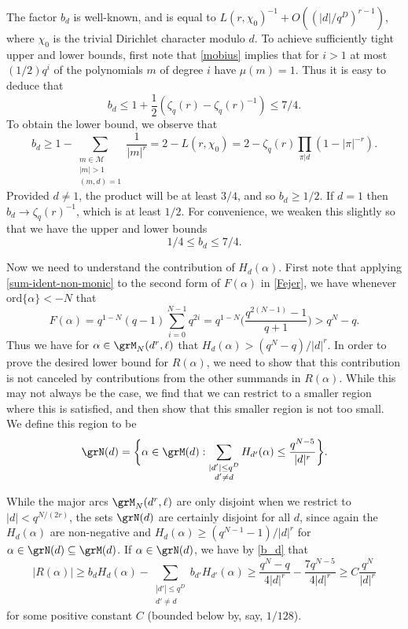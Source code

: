 \documentclass[reqno,11pt]{amsart}
\theoremstyle{definition}
\theoremstyle{remark}
\numberwithin{equation}{section}
\def\calM{{\mathcal M}}
\newcommand{\ord}{\text{ord}}
\newcommand{\<}{\begin{equation}}
\renewcommand{\>}{\end{equation}}
\begin{document}
The factor $b_d$ is well-known, and is equal to $L(r,\chi_0)^{-1} + O((|d|/q^D)^{r-1})$, where $\chi_0$ is the trivial Dirichlet character modulo $d$. To achieve sufficiently tight upper and lower bounds, first note that \eqref{mobius} implies that for $i>1$ at most $(1/2)q^i$ of the polynomials $m$ of degree $i$ have $\mu(m) = 1$. Thus it is easy to deduce that
\<
b_d \leq 1+\dfrac{1}{2}(\zeta_q(r)-\zeta_q(r)^{-1}) \leq 7/4.
\>
To obtain the lower bound, we observe that
\[b_d \geq 1 - \sum_{\substack{m \in \calM \\ |m| > 1 \\ (m,d) = 1}}\dfrac{1}{|m|^r} = 2 - L(r,\chi_0) = 2 - \zeta_q(r)\prod_{\pi | d} (1-|\pi|^{-r}).\]
Provided $d \neq 1$, the product will be at least $3/4$, and so $b_d \geq 1/2$. If $d = 1$ then $b_d \rightarrow \zeta_q(r)^{-1}$, which is at least $1/2$. For convenience, we weaken this slightly so that we have the upper and lower bounds
\<\label{b_d}
1/4 \leq b_d \leq 7/4.
\>

Now we need to understand the contribution of $H_d(\alpha)$. First note that applying \eqref{sum-ident-non-monic} to the second form of $F(\alpha)$ in \eqref{Fejer}, we have whenever $\ord\{\alpha\}<-N$ that 
\[F(\alpha) = q^{1-N}(q-1)\sum_{i=0}^{N-1} q^{2i} = q^{1-N}\bigg(\dfrac{q^{2(N-1)}-1}{q+1}\bigg) > q^N-q.\]
Thus we have for $\alpha \in \grM_N(d^r,\ell)$ that $H_d(\alpha) > (q^N-q)/|d|^r$. In order to prove the desired lower bound for $R(\alpha)$, we need to show that this contribution is not canceled by contributions from the other summands in $R(\alpha)$. While this may not always be the case, we find that we can restrict to a smaller region where this is satisfied, and then show that this smaller region is not too small. We define this region to be
\[\grN(d) = \bigg\{\alpha \in \grM(d): \sum_{\substack{|d'| \leq q^D \\ d' \neq d}}H_{d'}(\alpha)\leq \dfrac{q^{N - 5}}{|d|^r}\bigg\}.\]

While the major arcs $\grM_N(d^r,\ell)$ are only disjoint when we restrict to $|d|< q^{N/(2r)}$, the sets $\grN(d)$ are certainly disjoint for all $d$, since again the $H_d(\alpha)$ are non-negative and $H_d(\alpha) \geq (q^{N-1}-1)/|d|^r$ for $\alpha \in \grN(d) \subseteq \grM(d)$. If $\alpha \in \grN(d)$, we have by \eqref{b_d} that
\[|R(\alpha)|\geq b_d H_d(\alpha) - \sum_{\substack{|d'| \leq q^D \\ d' \neq d}} b_{d'}H_{d'}(\alpha) \geq \dfrac{q^N-q}{4|d|^r} - \dfrac{7q^{N-5}}{4|d|^r} \geq C\dfrac{q^N}{|d|^r}\]
for some positive constant $C$ (bounded below by, say, $1/128$).
\end{document}
